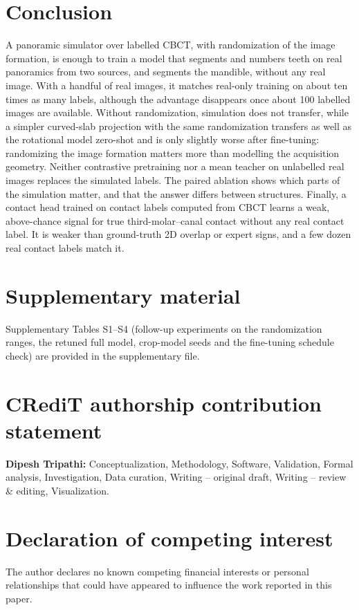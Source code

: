 \documentclass[preprint,12pt]{elsarticle}
\begin{document}
\section{Conclusion}

A panoramic simulator over labelled CBCT, with randomization of the image formation, is enough to train a model that
segments and numbers teeth on real panoramics from two sources, and segments the mandible, without any real image. With
a handful of real images, it matches real-only training on about ten times as many labels, although the advantage
disappears once about 100 labelled images are available. Without randomization, simulation does not transfer, while a
simpler curved-slab projection with the same randomization transfers as well as the rotational model zero-shot and is
only slightly worse after fine-tuning: randomizing the image formation matters more than modelling the acquisition
geometry. Neither contrastive pretraining nor a mean teacher on unlabelled real images replaces the simulated labels. The paired ablation shows which parts of the
simulation matter, and that the answer differs between structures. Finally, a contact head trained on contact labels
computed from CBCT learns a weak, above-chance signal for true third-molar--canal contact without any real contact
label. It is weaker than ground-truth 2D overlap or expert signs, and a few dozen real contact labels match it.

\section*{Supplementary material}
Supplementary Tables S1--S4 (follow-up experiments on the randomization ranges, the retuned full model, crop-model seeds
and the fine-tuning schedule check) are provided in the supplementary file.

\section*{CRediT authorship contribution statement}
\textbf{Dipesh Tripathi:} Conceptualization, Methodology, Software, Validation, Formal analysis, Investigation, Data
curation, Writing -- original draft, Writing -- review \& editing, Visualization.

\section*{Declaration of competing interest}
The author declares no known competing financial interests or personal relationships that could have
appeared to influence the work reported in this paper.
\end{document}
